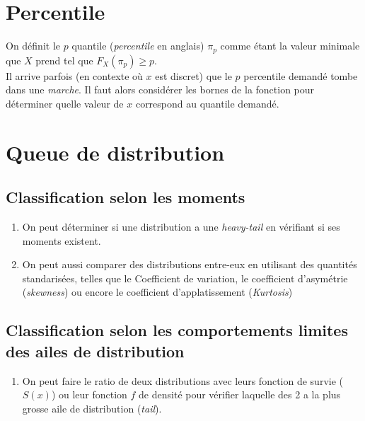 \documentclass[12pt, french]{report}
\begin{document}
\section{Percentile}
\label{sec:percentile}
On définit le $p$ quantile (\emph{percentile} en anglais) $\pi_p$ comme étant la valeur minimale que $X$ prend tel que $F_X(\pi_p) \geq p$. \\

Il arrive parfois (en contexte où $x$  est discret) que le $p$ percentile demandé tombe dans une \emph{marche}. Il faut alors considérer les bornes de la fonction pour déterminer quelle valeur de $x$ correspond au quantile demandé.


\section{Queue de distribution}
\subsection{Classification selon les moments}
\begin{enumerate}[label=\faAngleRight]
\item On peut déterminer si une distribution a une \textit{heavy-tail} en vérifiant si ses moments existent.

\item On peut aussi comparer des distributions entre-eux en utilisant des quantités standarisées, telles que le Coefficient de variation, le coefficient d'asymétrie (\textit{skewness}) ou encore le coefficient d'applatissement (\textit{Kurtosis})
\end{enumerate}

\subsection{Classification selon les comportements limites des ailes de distribution}
\begin{enumerate}[label=\faAngleRight]
\item On peut faire le ratio de deux distributions avec leurs fonction de survie ($S(x)$) ou leur fonction $f$ de densité pour vérifier laquelle des 2 a la plus grosse aile de distribution (\textit{tail}).

\end{enumerate}
\end{document}
